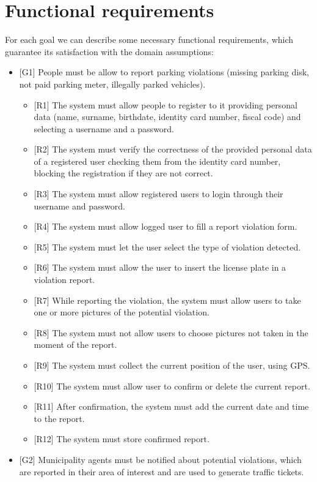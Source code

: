 \documentclass[a4paper]{report}
\begin{document}
\section{Functional requirements}
For each goal we can describe some necessary functional requirements, which guarantee its satisfaction with the domain assumptions:
\begin{itemize}
\item {[G1]} People must be allow to report parking violations (missing parking disk, not paid parking meter, illegally parked vehicles).
\begin{itemize}
\item {[R1]}	The system must allow people to register to it providing personal data (name, surname, birthdate, identity card number, fiscal code) and selecting a username and a password.
\item {[R2]}	The system must verify the correctness of the provided personal data of a registered user checking them from the identity card number, blocking the registration if they are not correct.
\item {[R3]}	The system must allow registered users to login through their username and password.
\item {[R4]}	The system must allow logged user to fill a report violation form.
\item {[R5]}	The system must let the user select the type of violation detected.
\item {[R6]}	The system must allow the user to insert the license plate in a violation report.
\item {[R7]}	While reporting the violation, the system must allow users to take one or more pictures of the potential violation.
\item {[R8]}	The system must not allow users to choose pictures not taken in the moment of the report.
\item {[R9]}	The system must collect the current position of the user, using GPS.
\item {[R10]}	The system must allow user to confirm or delete the current report.
\item {[R11]}	After confirmation, the system must add the current date and time to the report.
\item {[R12]}	The system must store confirmed report.
\end{itemize}
\item {[G2]} Municipality agents must be notified about potential violations, which are reported in their area of interest and are used to generate traffic tickets.

\end{itemize}
\end{document}
